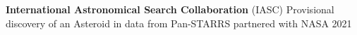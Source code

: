 \begin{entry}{{\bf International Astronomical Search Collaboration} (IASC)}{}
	Provisional discovery of an Asteroid in data from Pan-STARRS partnered with NASA \hfill 2021

\end{entry}
	